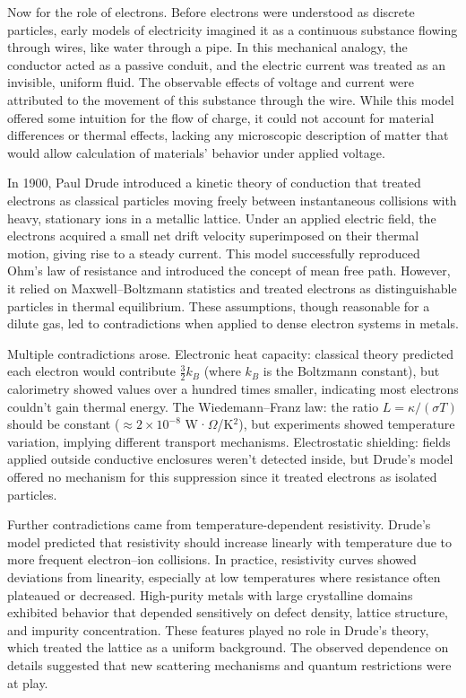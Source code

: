 Now for the role of electrons. Before electrons were understood as discrete particles, early models of electricity imagined it as a continuous substance flowing through wires, like water through a pipe. In this mechanical analogy, the conductor acted as a passive conduit, and the electric current was treated as an invisible, uniform fluid. The observable effects of voltage and current were attributed to the movement of this substance through the wire. While this model offered some intuition for the flow of charge, it could not account for material differences or thermal effects, lacking any microscopic description of matter that would allow calculation of materials' behavior under applied voltage.

In 1900, Paul Drude introduced a kinetic theory of conduction that treated electrons as classical particles moving freely between instantaneous collisions with heavy, stationary ions in a metallic lattice. Under an applied electric field, the electrons acquired a small net drift velocity superimposed on their thermal motion, giving rise to a steady current. This model successfully reproduced Ohm's law of resistance and introduced the concept of mean free path. However, it relied on Maxwell–Boltzmann statistics and treated electrons as distinguishable particles in thermal equilibrium. These assumptions, though reasonable for a dilute gas, led to contradictions when applied to dense electron systems in metals.

Multiple contradictions arose. Electronic heat capacity: classical theory predicted each electron would contribute $\tfrac{3}{2}k_B$ (where $k_B$ is the Boltzmann constant), but calorimetry showed values over a hundred times smaller, indicating most electrons couldn't gain thermal energy. The Wiedemann–Franz law: the ratio $L = \kappa / (\sigma T)$ should be constant ($\approx 2 \times 10^{-8}$ W·$\Omega$/K$^2$), but experiments showed temperature variation, implying different transport mechanisms. Electrostatic shielding: fields applied outside conductive enclosures weren't detected inside, but Drude's model offered no mechanism for this suppression since it treated electrons as isolated particles.

Further contradictions came from temperature-dependent resistivity. Drude's model predicted that resistivity should increase linearly with temperature due to more frequent electron–ion collisions. In practice, resistivity curves showed deviations from linearity, especially at low temperatures where resistance often plateaued or decreased. High-purity metals with large crystalline domains exhibited behavior that depended sensitively on defect density, lattice structure, and impurity concentration. These features played no role in Drude's theory, which treated the lattice as a uniform background. The observed dependence on details suggested that new scattering mechanisms and quantum restrictions were at play.

